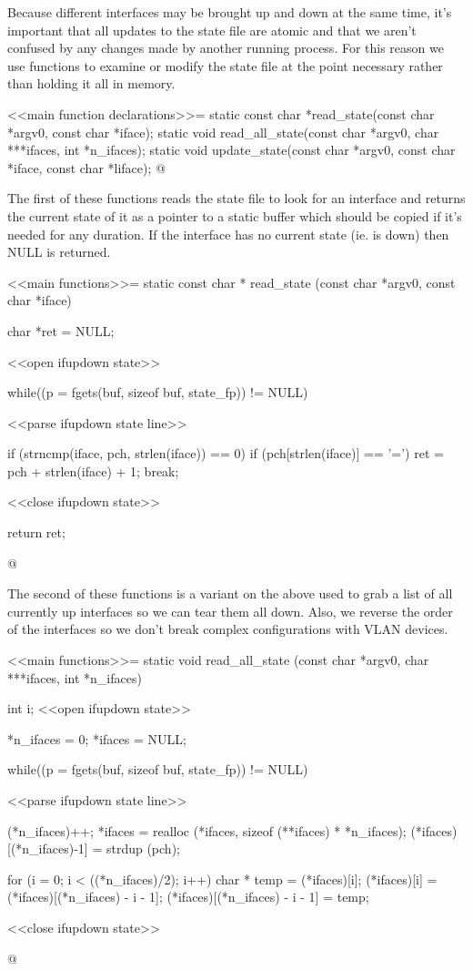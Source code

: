 \documentclass{article}
\begin{document}
Because different interfaces may be brought up and down at the same time,
it's important that all updates to the state file are atomic and that we
aren't confused by any changes made by another running process.  For this
reason we use functions to examine or modify the state file at the point
necessary rather than holding it all in memory.

<<main function declarations>>=
static const char *read_state(const char *argv0, const char *iface);
static void read_all_state(const char *argv0, char ***ifaces, int *n_ifaces);
static void update_state(const char *argv0, const char *iface, const char *liface);
@ 

The first of these functions reads the state file to look for an interface
and returns the current state of it as a pointer to a static buffer which
should be copied if it's needed for any duration.  If the interface has no
current state (ie. is down) then NULL is returned.

<<main functions>>=
static const char *
read_state (const char *argv0, const char *iface)
{
	char *ret = NULL;

	<<open ifupdown state>>

	while((p = fgets(buf, sizeof buf, state_fp)) != NULL) {
		<<parse ifupdown state line>>

		if (strncmp(iface, pch, strlen(iface)) == 0) {
			if (pch[strlen(iface)] == '=') {
				ret = pch + strlen(iface) + 1;
				break;
			}
		}
	}

	<<close ifupdown state>>

	return ret;
}
@

The second of these functions is a variant on the above used to grab a list
of all currently up interfaces so we can tear them all down. Also, we reverse
the order of the interfaces so we don't break complex
configurations with VLAN devices.

<<main functions>>=
static void
read_all_state (const char *argv0, char ***ifaces, int *n_ifaces)
{
	int i;
	<<open ifupdown state>>

	*n_ifaces = 0;
	*ifaces = NULL;

	while((p = fgets(buf, sizeof buf, state_fp)) != NULL) {
		<<parse ifupdown state line>>

		(*n_ifaces)++;
		*ifaces = realloc (*ifaces, sizeof (**ifaces) * *n_ifaces);
		(*ifaces)[(*n_ifaces)-1] = strdup (pch);
	}

	for (i = 0; i < ((*n_ifaces)/2); i++) {
		char * temp = (*ifaces)[i];
		(*ifaces)[i] = (*ifaces)[(*n_ifaces) - i - 1];
		(*ifaces)[(*n_ifaces) - i - 1] = temp;
	}

	<<close ifupdown state>>
}
@
\end{document}
